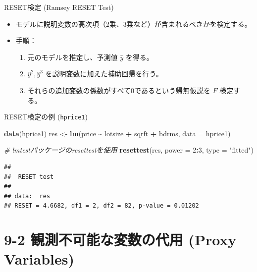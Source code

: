 \documentclass[
  ignorenonframetext,
]{beamer}
\newenvironment{Shaded}{\begin{snugshade}}{\end{snugshade}}
\newcommand{\AttributeTok}[1]{\textcolor[rgb]{0.13,0.29,0.53}{#1}}
\newcommand{\CommentTok}[1]{\textcolor[rgb]{0.56,0.35,0.01}{\textit{#1}}}
\newcommand{\DecValTok}[1]{\textcolor[rgb]{0.00,0.00,0.81}{#1}}
\newcommand{\FunctionTok}[1]{\textcolor[rgb]{0.13,0.29,0.53}{\textbf{#1}}}
\newcommand{\NormalTok}[1]{#1}
\newcommand{\OtherTok}[1]{\textcolor[rgb]{0.56,0.35,0.01}{#1}}
\newcommand{\SpecialCharTok}[1]{\textcolor[rgb]{0.81,0.36,0.00}{\textbf{#1}}}
\newcommand{\StringTok}[1]{\textcolor[rgb]{0.31,0.60,0.02}{#1}}
\providecommand{\tightlist}{%
  \setlength{\itemsep}{0pt}\setlength{\parskip}{0pt}}
\begin{document}
\begin{frame}{RESET検定 (Ramsey RESET Test)}
\label{resetux691cux5b9a-ramsey-reset-test}
\begin{itemize}
\tightlist
\item
  モデルに説明変数の高次項（2乗、3乗など）が含まれるべきかを検定する。
\item
  手順：

  \begin{enumerate}
  \tightlist
  \item
    元のモデルを推定し、予測値 \(\hat{y}\) を得る。
  \item
    \(\hat{y}^2, \hat{y}^3\) を説明変数に加えた補助回帰を行う。
  \item
    それらの追加変数の係数がすべて0であるという帰無仮説を \(F\)
    検定する。
  \end{enumerate}
\end{itemize}
\end{frame}

\begin{frame}[fragile]{RESET検定の例 (\texttt{hprice1})}
\label{resetux691cux5b9aux306eux4f8b-hprice1}
\footnotesize

\begin{Shaded}
\begin{Highlighting}[]
\FunctionTok{data}\NormalTok{(hprice1)}
\NormalTok{res }\OtherTok{\textless{}{-}} \FunctionTok{lm}\NormalTok{(price }\SpecialCharTok{\textasciitilde{}}\NormalTok{ lotsize }\SpecialCharTok{+}\NormalTok{ sqrft }\SpecialCharTok{+}\NormalTok{ bdrms, }\AttributeTok{data =}\NormalTok{ hprice1)}

\CommentTok{\# lmtestパッケージのresettestを使用}
\FunctionTok{resettest}\NormalTok{(res, }\AttributeTok{power =} \DecValTok{2}\SpecialCharTok{:}\DecValTok{3}\NormalTok{, }\AttributeTok{type =} \StringTok{"fitted"}\NormalTok{)}
\end{Highlighting}
\end{Shaded}

\begin{verbatim}
## 
##  RESET test
## 
## data:  res
## RESET = 4.6682, df1 = 2, df2 = 82, p-value = 0.01202
\end{verbatim}

\normalsize
\end{frame}

\section{9-2 観測不可能な変数の代用 (Proxy
Variables)}\label{ux89b3ux6e2cux4e0dux53efux80fdux306aux5909ux6570ux306eux4ee3ux7528-proxy-variables}
\end{document}
